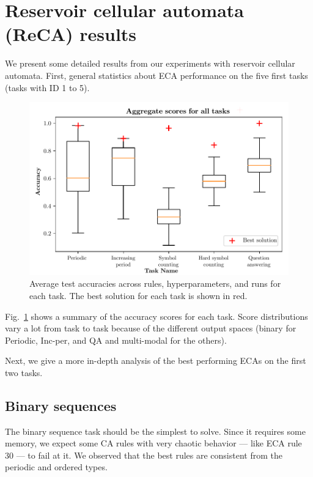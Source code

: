 \section{Reservoir cellular automata (ReCA) results}

We present some detailed results from our experiments with reservoir cellular
automata. First, general statistics about \ac{ECA} performance on the five first
tasks (tasks with ID 1 to 5).

\begin{figure}[htbp]
  \centering
  \includegraphics[width=.8\linewidth]{figures/aggregate_results.pdf}
  \caption{Average test accuracies across rules, hyperparameters, and runs for
    each task. The best solution for each task is shown in
    red.}\label{fig:aggregate-results}
\end{figure}

Fig.~\ref{fig:aggregate-results} shows a summary of the accuracy scores for each
task. Score distributions vary a lot from task to task because of the different
output spaces (binary for Periodic, Inc-per, and QA and multi-modal for the
others).

Next, we give a more in-depth analysis of the best performing \acp{ECA} on the
first two tasks.

\subsection{Binary sequences}

The binary sequence task should be the simplest to solve. Since it requires some
memory, we expect some CA rules with very chaotic behavior --- like ECA rule 30
--- to fail at it. We observed that the best rules are consistent from the
periodic and ordered types.

